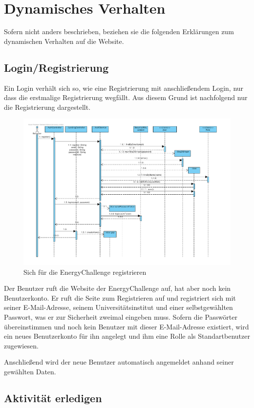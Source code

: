 \section{Dynamisches Verhalten}
Sofern nicht anders beschrieben, beziehen sie die folgenden Erklärungen zum dynamischen Verhalten auf die Website.
\subsection{Login/Registrierung}

Ein Login verhält sich so, wie eine Registrierung mit anschließendem Login, nur dass die erstmalige Registrierung wegfällt. Aus diesem Grund ist nachfolgend nur die Registrierung dargestellt.

\begin{figure}[H]
  \centering
  \includegraphics[width=\textwidth, clip]{gfx/registrieren}
  \caption{Sich für die EnergyChallenge registrieren}
\end{figure}

Der Benutzer ruft die Website der EnergyChallenge auf, hat aber noch kein Benutzerkonto. Er ruft die Seite zum Registrieren auf und registriert sich mit seiner E-Mail-Adresse, seinem Universitätsinstitut und einer selbstgewählten Passwort, was er zur Sicherheit zweimal eingeben muss. Sofern die Passwörter übereinstimmen und noch kein Benutzer mit dieser E-Mail-Adresse existiert, wird ein neues Benutzerkonto für ihn angelegt und ihm eine Rolle als Standartbenutzer zugewiesen.

Anschließend wird der neue Benutzer automatisch angemeldet anhand seiner gewählten Daten.

\subsection{Aktivität erledigen}

